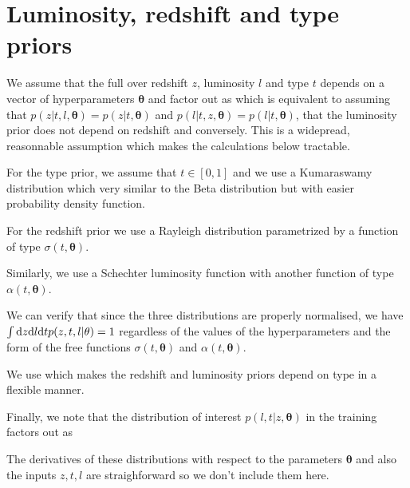 \documentclass[aps,prd,showpacs,superscriptaddress,groupedaddress]{revtex4}  %
\begin{document}
\section{Luminosity, redshift and type priors}

We assume that the full over redshift $z$, luminosity $l$ and type $t$ depends on a vector of hyperparameters $\bm{\theta}$ and   factor out as
which is equivalent to assuming that $p(z | t, l, \bm{\theta}) = p(z | t, \bm{\theta})$ and $p(l | t, z, \bm{\theta})=p(l | t, \bm{\theta})$, \ie that the luminosity prior does not depend on redshift and conversely. 
This is a widepread, reasonnable assumption which makes the calculations below tractable.

For the type prior, we assume that $t\in[0,1]$ and we use a Kumaraswamy distribution
which very similar to the Beta distribution but with easier probability density function.

For the redshift prior we use a Rayleigh distribution
parametrized by a function of type $\sigma(t,\bm{\theta})$.

Similarly, we use a Schechter luminosity function
with another function of type $\alpha(t,\bm{\theta})$.

We can verify that since the three distributions are properly normalised, we have $\int\d z\d l \d t p(z,t,l | \vec{\theta}) = 1$ regardless of the values of the hyperparameters and the form of the free functions $\sigma(t,\bm{\theta})$ and $\alpha(t,\bm{\theta})$.

We use 
which makes the redshift and luminosity priors depend on type in a flexible manner.

Finally, we note that the distribution of interest $p(l,t|z,\bm{\theta})$ in the training factors out as
 
The derivatives of these distributions with respect to the parameters $\bm{\theta}$ and also the inputs $z,t,l$ are straighforward so we don't include them here.
\end{document}
